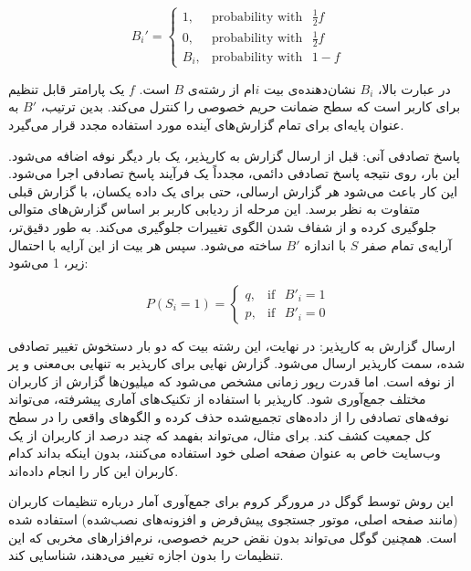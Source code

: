$$B_i' = 
\begin{cases} 
1, & \text{probability with } \hspace{5pt} \frac{1}{2}f \\
0, & \text{probability with } \hspace{5pt} \frac{1}{2}f \\
B_i, & \text{probability with } \hspace{5pt} 1 - f 
\end{cases}$$

در عبارت بالا، $B_i$ نشان‌دهنده‌ی بیت $i$ام از رشته‌ی $B$ است. $f$ یک پارامتر قابل تنظیم برای کاربر است که سطح ضمانت حریم خصوصی را کنترل می‌کند. بدین ترتیب، $B'$ به عنوان پایه‌ای برای تمام گزارش‌های آینده مورد استفاده مجدد قرار می‌گیرد.

 پاسخ تصادفی آنی: قبل از ارسال گزارش به کارپذیر، یک بار دیگر نوفه اضافه می‌شود. این بار، روی نتیجه پاسخ تصادفی دائمی، مجدداً یک فرآیند پاسخ تصادفی اجرا می‌شود. این کار باعث می‌شود هر گزارش ارسالی، حتی برای یک داده یکسان، با گزارش قبلی متفاوت به نظر برسد. این مرحله از ردیابی کاربر بر اساس گزارش‌های متوالی جلوگیری کرده و از شفاف شدن الگوی تغییرات جلوگیری می‌کند. به طور دقیق‌تر، آرایه‌ی تمام صفر $S$ با اندازه $B'$ ساخته می‌شود. سپس هر بیت از این آرایه با احتمال زیر، 1 می‌شود:

$$P(S_i = 1) = 
\begin{cases} 
q, & \text{if } \hspace{5pt} B'_i = 1 \\ 
p, & \text{if } \hspace{5pt} B'_i = 0 
\end{cases}$$

 ارسال گزارش به کارپذیر: در نهایت، این رشته بیت که دو بار دستخوش تغییر تصادفی شده، سمت کارپذیر ارسال می‌شود. گزارش نهایی برای کارپذیر به تنهایی بی‌معنی و پر از نوفه است. اما قدرت رپور زمانی مشخص می‌شود که میلیون‌ها گزارش از کاربران مختلف جمع‌آوری شود. کارپذیر با استفاده از تکنیک‌های آماری پیشرفته، می‌تواند نوفه‌های تصادفی را از داده‌های تجمیع‌شده حذف کرده و الگوهای واقعی را در سطح کل جمعیت کشف کند. برای مثال، می‌تواند بفهمد که چند درصد از کاربران از یک وب‌سایت خاص به عنوان صفحه اصلی خود استفاده می‌کنند، بدون اینکه بداند کدام کاربران این کار را انجام داده‌اند.


این روش توسط گوگل در مرورگر کروم برای جمع‌آوری آمار درباره تنظیمات کاربران (مانند صفحه اصلی، موتور جستجوی پیش‌فرض و افزونه‌های نصب‌شده) استفاده شده است. همچنین گوگل می‌تواند بدون نقض حریم خصوصی، نرم‌افزارهای مخربی که این تنظیمات را بدون اجازه تغییر می‌دهند، شناسایی کند.

